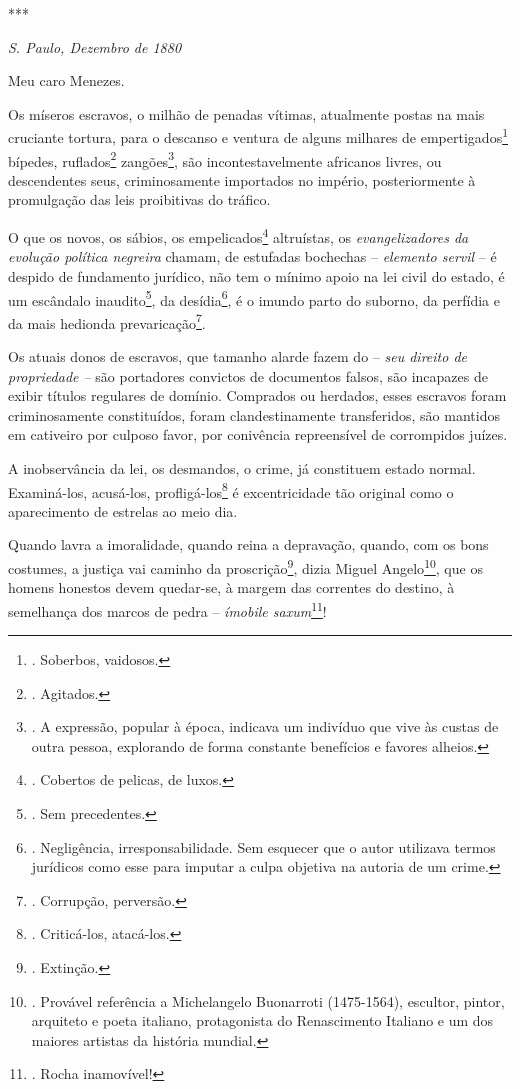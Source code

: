 ***

\emph{S. Paulo, Dezembro de 1880}

Meu caro Menezes.

Os míseros escravos, o milhão de penadas vítimas, atualmente postas na
mais cruciante tortura, para o descanso e ventura de alguns milhares de
empertigados\footnote{. Soberbos, vaidosos.} bípedes, ruflados\footnote{.
  Agitados.} zangões\footnote{. A expressão, popular à época, indicava
  um indivíduo que vive às custas de outra pessoa, explorando de forma
  constante benefícios e favores alheios.}, são incontestavelmente
africanos livres, ou descendentes seus, criminosamente importados no
império, posteriormente à promulgação das leis proibitivas do tráfico.

O que os novos, os sábios, os empelicados\footnote{. Cobertos de
  pelicas, de luxos.} altruístas, os \emph{evangelizadores da evolução
política negreira} chamam, de estufadas bochechas -- \emph{elemento
servil} -- é despido de fundamento jurídico, não tem o mínimo apoio na
lei civil do estado, é um escândalo inaudito\footnote{. Sem precedentes.},
da desídia\footnote{. Negligência, irresponsabilidade. Sem esquecer que
  o autor utilizava termos jurídicos como esse para imputar a culpa
  objetiva na autoria de um crime.}, é o imundo parto do suborno, da
perfídia e da mais hedionda prevaricação\footnote{. Corrupção,
  perversão.}.

Os atuais donos de escravos, que tamanho alarde fazem do -- \emph{seu
direito de propriedade --} são portadores convictos de documentos
falsos, são incapazes de exibir títulos regulares de domínio. Comprados
ou herdados, esses escravos foram criminosamente constituídos, foram
clandestinamente transferidos, são mantidos em cativeiro por culposo
favor, por conivência repreensível de corrompidos juízes.

A inobservância da lei, os desmandos, o crime, já constituem estado
normal. Examiná-los, acusá-los, profligá-los\footnote{. Criticá-los,
  atacá-los.} é excentricidade tão original como o aparecimento de
estrelas ao meio dia.

Quando lavra a imoralidade, quando reina a depravação, quando, com os
bons costumes, a justiça vai caminho da proscrição\footnote{. Extinção.},
dizia Miguel Angelo\footnote{. Provável referência a Michelangelo
  Buonarroti (1475-1564), escultor, pintor, arquiteto e poeta italiano,
  protagonista do Renascimento Italiano e um dos maiores artistas da
  história mundial.}, que os homens honestos devem quedar-se, à margem
das correntes do destino, à semelhança dos marcos de pedra --
\emph{ímobile saxum}\footnote{. Rocha inamovível!}!

